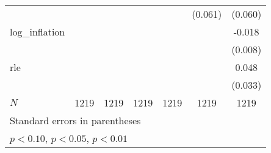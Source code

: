 {\begin{tabular}{l*{6}{c}}
            &                     &                     &                     &                     &     (0.061)         &     (0.060)         \\
\addlinespace
log\_inflation&                     &                     &                     &                     &                     &      -0.018\sym{**} \\
            &                     &                     &                     &                     &                     &     (0.008)         \\
\addlinespace
rle         &                     &                     &                     &                     &                     &       0.048         \\
            &                     &                     &                     &                     &                     &     (0.033)         \\
\midrule
\(N\)       &        1219         &        1219         &        1219         &        1219         &        1219         &        1219         \\
\bottomrule
\multicolumn{7}{l}{\footnotesize Standard errors in parentheses}\\
\multicolumn{7}{l}{\footnotesize \sym{*} \(p<0.10\), \sym{**} \(p<0.05\), \sym{***} \(p<0.01\)}\\
\end{tabular}
}
